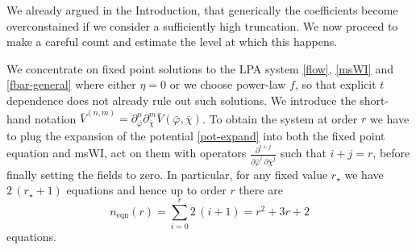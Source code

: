 \documentclass[11pt,a4paper]{article}
\numberwithin{figure}{section}
\numberwithin{equation}{section}
\newcommand{\bp}{\bar \varphi} %
\newcommand{\bc}{\bar \chi} %
\begin{document}

We already argued in the Introduction, that generically the coefficients become overconstained if we consider a sufficiently high truncation. We now proceed to make a careful count and estimate the level at which this happens.




We concentrate on fixed point solutions to the LPA system \eqref{flow}, \eqref{msWI} and \eqref{fbar-general} where either $\eta=0$ or we choose power-law $f$, so that explicit $t$ dependence does not already rule out such solutions. We introduce the short-hand notation $\bar V ^{(n,m)}=\partial_{\bar \varphi}^n \partial_{\bar \chi}^m \bar V(\bp,\bc)$. 
To obtain the system at order $r$ we have to plug the expansion of the potential \eqref{pot-expand}
into both the fixed point equation and msWI, act on them with operators $\frac{\partial^{i+j}}{\partial \bar\varphi^i \, \partial \bar\chi^j}$ such that $i+j=r$, before finally setting the fields to zero. In particular, for any fixed value $r_{\star}$ we have $2 \, (r_{\star}+1)$ equations
and hence up to order $r$ there are
\begin{equation}
\label{number_eqns}
n_{\text{eqn}}(r) = \sum_{i=0}^{r} 2\,(i+1) = r^2 + 3r + 2 
\end{equation}
equations. 
\end{document}
